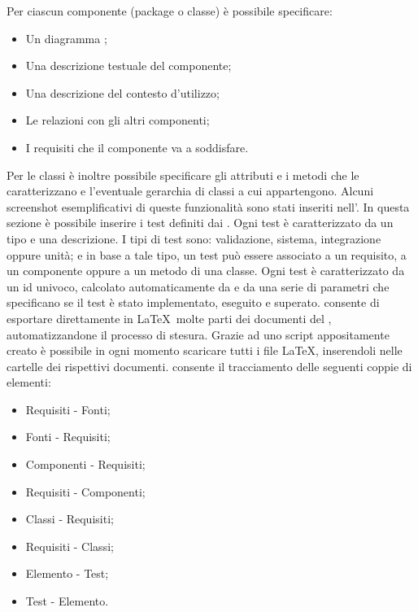 \label{pdbPackageClassi}
Per ciascun componente (package o classe) è possibile specificare:
\begin{itemize}
\item Un diagramma ;
\item Una descrizione testuale del componente;
\item Una descrizione del contesto d'utilizzo;
\item Le relazioni con gli altri componenti;
\item I requisiti che il componente va a soddisfare.
\end{itemize}
Per le classi è inoltre possibile specificare gli attributi e i metodi che le caratterizzano e l'eventuale gerarchia di classi a cui appartengono. Alcuni screenshot esemplificativi di queste funzionalità sono stati inseriti nell'.
\label{pdbTest}
In questa sezione è possibile inserire i test definiti dai \rPs{}. Ogni test è caratterizzato da un tipo e una descrizione.
I tipi di test sono: validazione, sistema, integrazione oppure unità; e in base a tale tipo, un test può essere associato a un requisito, a un componente oppure a un metodo di una classe.
Ogni test è caratterizzato da un id univoco, calcolato automaticamente da \pragmadb e da una serie di parametri che specificano se il test è stato implementato, eseguito e superato.
 \label{pragmadbTracciamento}
\pragmadb consente di esportare direttamente in \LaTeX\ molte parti dei documenti
del , automatizzandone il processo di stesura. Grazie ad uno script
appositamente creato è possibile in ogni momento scaricare tutti i file \LaTeX, inserendoli
nelle cartelle dei rispettivi documenti.
\pragmadb consente il tracciamento delle seguenti coppie di elementi:
\begin{itemize}
\item Requisiti - Fonti;
\item Fonti - Requisiti;
\item Componenti - Requisiti;
\item Requisiti - Componenti;
\item Classi - Requisiti;
\item Requisiti - Classi;
\item Elemento - Test;
\item Test - Elemento.
\end{itemize}
